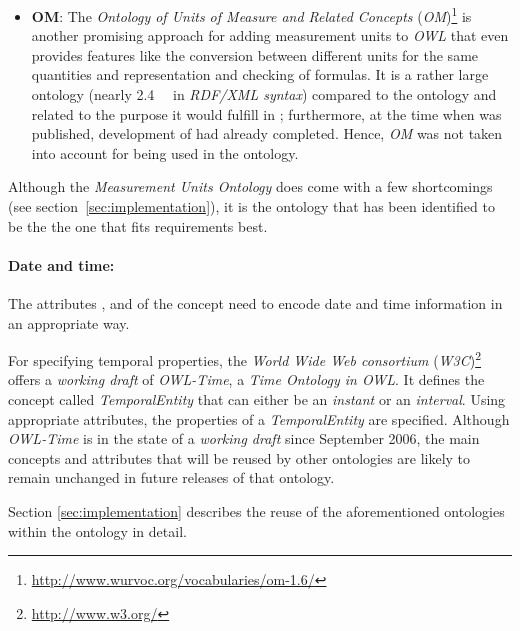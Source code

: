 \begin{itemize}
  \item \textbf{OM}: The \emph{Ontology of Units of Measure and Related Concepts} (\emph{OM})\footnote{\href{http://www.wurvoc.org/vocabularies/om-1.6/}{http://www.wurvoc.org/vocabularies/om-1.6/}}\cite{OM} is another promising approach for adding measurement units to \emph{OWL} that even provides features like the conversion between different units for the same quantities and representation and checking of formulas. It is a rather large ontology (nearly \SI{2.4}{\mebi\byte} in \emph{RDF/XML syntax}) compared to the \thinkhomeweather ontology and related to the purpose it would fulfill in \thinkhomeweather; furthermore, at the time when \cite{OM} was published, development of \thinkhomeweather had already completed. Hence, \emph{OM} was not taken into account for being used in the \thinkhomeweather ontology.
\end{itemize}

Although the \emph{Measurement Units Ontology} does come with a few shortcomings (see section~\ref{sec:implementation}), it is the ontology that has been identified to be the the one that fits \thinkhomeweather requirements best.

\paragraph{Date and time:}

The attributes ,  and  of the concept  need to encode date and time information in an appropriate way.

For specifying temporal properties, the \emph{World Wide Web consortium} (\emph{W3C})\footnote{\href{http://www.w3.org/}{http://www.w3.org/}} offers a \emph{working draft}\cite{w3c-process} of \emph{OWL-Time}\cite{owl-time}, a \emph{Time Ontology in OWL}. It defines the concept called \emph{TemporalEntity} that can either be an \emph{instant} or an \emph{interval}. Using appropriate attributes, the properties of a \emph{TemporalEntity} are specified. Although \emph{OWL-Time} is in the state of a \emph{working draft} since September 2006, the main concepts and attributes that will be reused by other ontologies are likely to remain unchanged in future releases of that ontology.

\vspace{1em}

Section \ref{sec:implementation} describes the reuse of the aforementioned ontologies within the \thinkhomeweather ontology in detail.

